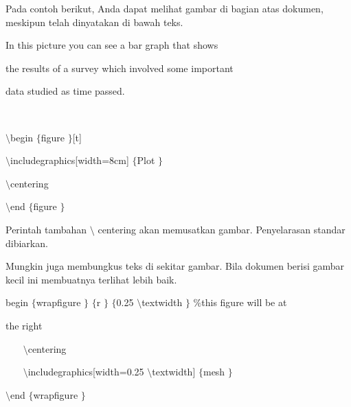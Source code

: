 Pada contoh berikut, Anda dapat melihat gambar di bagian atas dokumen, meskipun telah dinyatakan di bawah teks. \par
\vspace{14pt}
\noindent 
In this picture you can see a bar graph that shows \par
\vspace{12pt}
\noindent 
the results of a survey which involved some important \par
\vspace{12pt}
\noindent 
data studied as time passed. \par
\noindent 
 $  $ \par
\noindent 
 $  \setminus $begin $  \{  $figure $  \}  $[t] \par
\vspace{12pt}
\noindent 
 $  \setminus $includegraphics[width=8cm] $  \{  $Plot $  \}  $ \par
\vspace{12pt}
\noindent 
 $  \setminus $centering \par
\vspace{12pt}
\noindent 
 $  \setminus $end $  \{  $figure $  \}  $ \par
\vspace{18pt}
\vspace{18pt}
\noindent 
Perintah tambahan  $  \setminus $ centering akan memusatkan gambar. Penyelarasan standar dibiarkan. \par
\noindent 
Mungkin juga membungkus teks di sekitar gambar. Bila dokumen berisi gambar kecil ini membuatnya terlihat lebih baik. \par
\vspace{22pt}
\noindent 
begin $  \{  $wrapfigure $  \}  $ $  \{  $r $  \}  $ $  \{  $0.25 $  \setminus $textwidth $  \}  $  $  \%  $this figure will be at  \par
\vspace{12pt}
\noindent 
the right \par
\vspace{12pt}
\noindent 
~~~  $  \setminus $centering \par
\vspace{12pt}
\noindent 
~~~  $  \setminus $includegraphics[width=0.25 $  \setminus $textwidth] $  \{  $mesh $  \}  $ \par
\vspace{12pt}
\noindent 
 $  \setminus $end $  \{  $wrapfigure $  \}  $ \par
\noindent 
 $  $ \par
